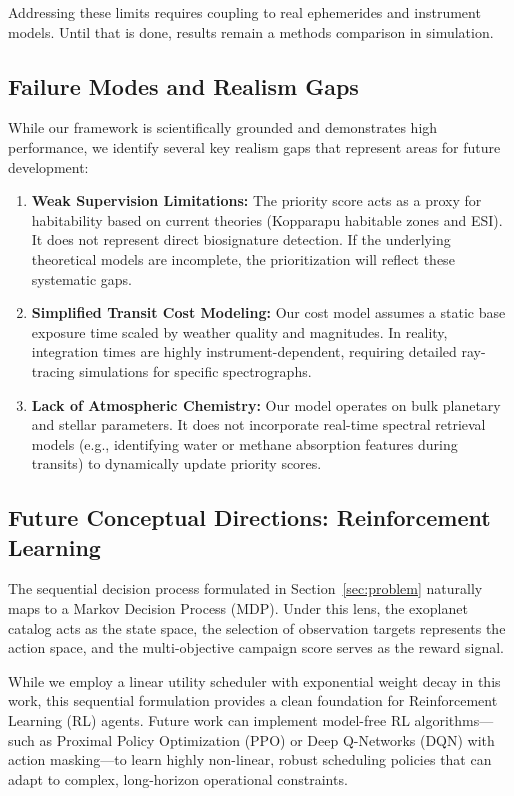 \documentclass[11pt,a4paper]{article}
\begin{document}
Addressing these limits requires coupling to real ephemerides and instrument models. Until that is done, results remain a methods comparison in simulation.

\subsection{Failure Modes and Realism Gaps}

While our framework is scientifically grounded and demonstrates high performance, we identify several key realism gaps that represent areas for future development:
\begin{enumerate}
    \item \textbf{Weak Supervision Limitations:} The priority score acts as a proxy for habitability based on current theories (Kopparapu habitable zones and ESI). It does not represent direct biosignature detection. If the underlying theoretical models are incomplete, the prioritization will reflect these systematic gaps.
    \item \textbf{Simplified Transit Cost Modeling:} Our cost model assumes a static base exposure time scaled by weather quality and magnitudes. In reality, integration times are highly instrument-dependent, requiring detailed ray-tracing simulations for specific spectrographs.
    \item \textbf{Lack of Atmospheric Chemistry:} Our model operates on bulk planetary and stellar parameters. It does not incorporate real-time spectral retrieval models (e.g., identifying water or methane absorption features during transits) to dynamically update priority scores.
\end{enumerate}

\subsection{Future Conceptual Directions: Reinforcement Learning}

The sequential decision process formulated in Section~\ref{sec:problem} naturally maps to a Markov Decision Process (MDP). Under this lens, the exoplanet catalog acts as the state space, the selection of observation targets represents the action space, and the multi-objective campaign score serves as the reward signal.

While we employ a linear utility scheduler with exponential weight decay in this work, this sequential formulation provides a clean foundation for Reinforcement Learning (RL) agents. Future work can implement model-free RL algorithms—such as Proximal Policy Optimization (PPO) or Deep Q-Networks (DQN) with action masking—to learn highly non-linear, robust scheduling policies that can adapt to complex, long-horizon operational constraints.
\end{document}
